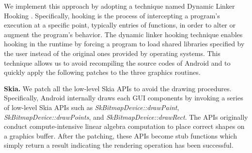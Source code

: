 \documentclass[conference]{IEEEtranl}
\begin{document}







	We implement this approach by adopting a technique named Dynamic Linker Hooking \cite{hooking}.
	Specifically, hooking is the process of intercepting a program's execution at a specific point, typically entries of functions, in order to alter or augment the program's behavior. The dynamic linker hooking technique enables hooking in the runtime by forcing a program to load shared libraries specified by the user instead of the original ones provided by operating systems. This technique allows us to avoid recompiling the source codes of Android and to quickly apply the following patches to the three graphics routines.

	\textbf{Skia.} 
	We patch all the low-level Skia APIs to avoid the drawing procedures. Specifically, Android internally draws each GUI components by invoking a series of low-level Skia APIs such as \textit{SkBitmapDevice::drawPaint}, \textit{SkBitmapDevice::drawPoints}, and \textit{SkBitmapDevice::drawRect}. The APIs originally conduct compute-intensive linear algebra computation to place correct shapes on a graphics buffer. After the patching, these APIs become stub functions which simply return a result indicating the rendering operation has been successful. 
\end{document}
